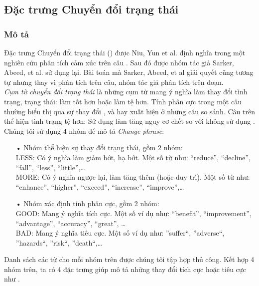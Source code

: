 \subsection{Đặc trưng Chuyển đổi trạng thái}
\subsubsection*{Mô tả}
Đặc trưng Chuyển đổi trạng thái () được Niu, Yun et al. định nghĩa trong một nghiên cứu phân tích cảm xúc trên câu \cite{niu2005analysis}. Sau đó được nhóm tác giả Sarker, Abeed, et al. sử dụng lại. Bài toán mà Sarker, Abeed, et al giải quyết cũng tương tự nhưng thay vì phân tích trên câu, nhóm tác giả phân tích trên đoạn.\\

\textit{Cụm từ chuyển đổi trạng thái} là những cụm từ mang ý nghĩa làm thay đổi tình trạng, trạng thái: làm tốt hơn hoặc làm tệ hơn. Tính phân cực trong một câu thường biểu thị qua sự thay đổi \cite{niu2005analysis}, và hay xuất hiện ở những câu so sánh.
Câu trên thể hiện tình trạng tệ hơn: Sử dụng  làm tăng nguy cơ chết so với không sử dụng .
Chúng tôi sử dụng 4 nhóm để mô tả \textit{Change phrase}:
\begin{itemize}
\item[•]Nhóm thể hiện sự thay đổi trạng thái, gồm 2 nhóm:\\
LESS: Có ý nghĩa làm giảm bớt, hạ bớt. Một số từ như: ``reduce'', ``decline'', ``fall'', ``less'', ``little'',\ldots \\
MORE: Có ý nghĩa ngược lại, làm tăng thêm (hoặc duy trì). Một số từ như: ``enhance'', ``higher'', ``exceed'', ``increase'', ``improve'',\ldots
\item[•]Nhóm xác định tính phân cực, gồm 2 nhóm:\\
GOOD: Mang ý nghĩa tích cực. Một số ví dụ như: ``benefit'', ``improvement'', ``advantage'', ``accuracy'', ``great'', \ldots\\
BAD: Mang ý nghĩa tiêu cực. Một số ví dụ như: ''suffer``, ''adverse``, ''hazards``, ''risk``, ''death``,\ldots
\end{itemize}
Danh sách các từ cho mỗi nhóm trên được chúng tôi tập hợp thủ công. Kết hợp 4 nhóm trên, ta có 4 đặc trưng giúp mô tả những thay đổi tích cực hoặc tiêu cực như .
